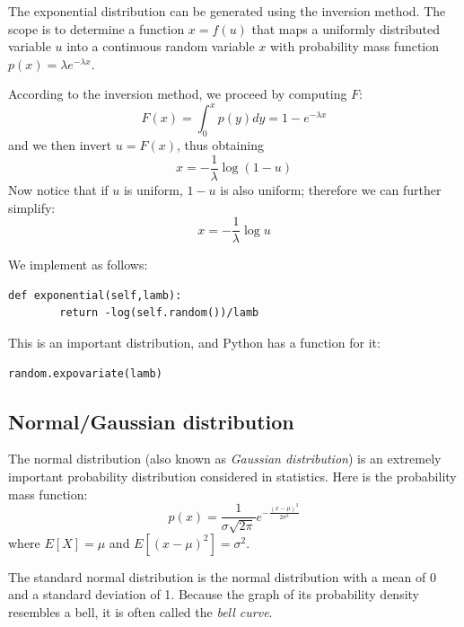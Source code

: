 \documentclass[justified,sixbynine]{tufte-book}
\def\ft{\small\tt}
\theoremstyle{plain}%
\theoremstyle{definition}
\theoremstyle{remark}
\begin{document}
\begin{fullwidth}
The exponential distribution can be generated using the inversion method.
The scope is to determine a function $x=f(u)$ that maps a uniformly distributed variable $u$
into a continuous random variable $x$ with probability mass function $%
p(x)=\lambda e^{-\lambda x}$.

According to the inversion method, we proceed by computing $F$:
\begin{equation}
F(x) = \int_0^x p(y)dy=1-e^{-\lambda x}
\end{equation}
and we then invert $u=F(x)$, thus obtaining
\begin{equation}
x=-\frac 1\lambda \log (1-u)
\end{equation}
Now notice that if $u$ is uniform, $1-u$ is also uniform; therefore we can further simplify:
\begin{equation}
x=-\frac 1\lambda \log u
\end{equation}

We implement as follows:

\begin{lstlisting}[caption={in file: {\ft nlib.py}}]
    def exponential(self,lamb):
        return -log(self.random())/lamb
\end{lstlisting}

This is an important distribution, and Python has a function for it:

\begin{lstlisting}
random.expovariate(lamb)
\end{lstlisting}

\goodbreak\subsection{Normal/Gaussian distribution}

The normal distribution (also known as {\it Gaussian distribution})
is an extremely important probability distribution
considered in statistics. Here is the probability mass function:
\begin{equation}
p(x)=\frac 1{\sigma \sqrt{2\pi }}e^{-\frac{(x-\mu )^2}{2\sigma ^2}}
\end{equation}
where $E[X]=\mu $ and $E[(x-\mu )^2]=\sigma ^2$.

The standard normal distribution is the normal distribution with a mean of
0 and a standard deviation of 1. Because the graph of its probability
density resembles a bell, it is often called the {\it bell curve}.


\end{fullwidth}
\end{document}
